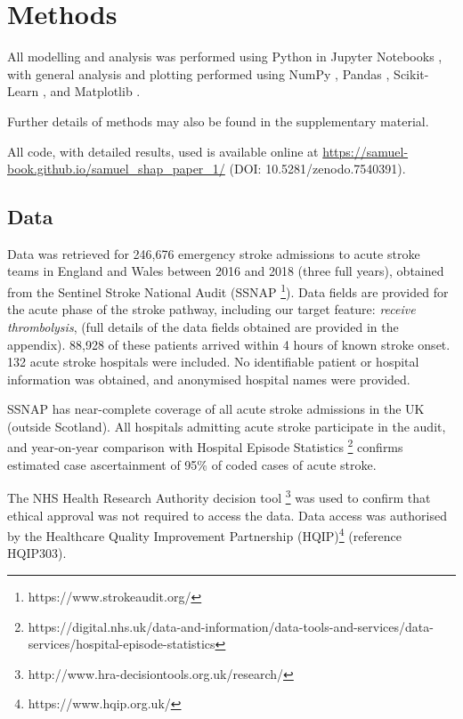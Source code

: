 \renewcommand{\thefootnote}{\alph{footnote}} %

\section{Methods}

All modelling and analysis was performed using Python in Jupyter Notebooks \cite{kluyver_jupyter_2016}, with general analysis and plotting performed using NumPy \cite{harris_array_2020}, Pandas \cite{mckinney-proc-scipy-2010}, Scikit-Learn  \cite{pedregosa_scikit-learn_2011}, and Matplotlib \cite{hunter_matplotlib_2007}. 

Further details of methods may also be found in the supplementary material. 

All code, with detailed results, used is available online at \url{https://samuel-book.github.io/samuel_shap_paper_1/} (DOI: 10.5281/zenodo.7540391). 

\subsection{Data}

Data was retrieved for 246,676 emergency stroke admissions to  acute stroke teams in England and Wales between 2016 and 2018 (three full years), obtained from the Sentinel Stroke National Audit (SSNAP \footnote{https://www.strokeaudit.org/}). Data fields are provided for the acute phase of the stroke pathway, including our target feature: \emph{receive thrombolysis}, (full details of the data fields obtained are provided in the appendix). 88,928 of these patients arrived within 4 hours of known stroke onset. 132 acute stroke hospitals were included. No identifiable patient or hospital information was obtained, and anonymised hospital names were provided.

 SSNAP has near-complete coverage of all acute stroke admissions in the UK (outside Scotland). All hospitals admitting acute stroke participate in the audit, and year-on-year comparison with Hospital Episode Statistics \footnote{https://digital.nhs.uk/data-and-information/data-tools-and-services/data-services/hospital-episode-statistics} confirms estimated case ascertainment of 95\% of coded cases of acute stroke.

The NHS Health Research Authority decision tool \footnote{http://www.hra-decisiontools.org.uk/research/} was used to confirm that ethical approval was not required to access the data. Data access was authorised by the Healthcare Quality Improvement Partnership (HQIP)\footnote{https://www.hqip.org.uk/} (reference HQIP303). 

